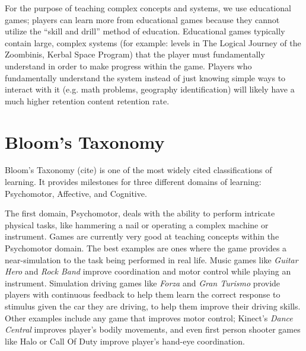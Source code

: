 \documentclass[12pt]{report}
\begin{document}
		For the purpose of teaching complex concepts and systems, we use educational games; players can learn more from educational games because they cannot utilize the ``skill and drill'' method of education. Educational games typically contain large, complex systems (for example: levels in The Logical Journey of the Zoombinis, Kerbal Space Program) that the player must fundamentally understand in order to make progress within the game. Players who fundamentally understand the system instead of just knowing simple ways to interact with it (e.g. math problems, geography identification) will likely have a much higher retention content retention rate.


	\section{Bloom's Taxonomy}

		Bloom's Taxonomy (cite) is one of the most widely cited classifications of learning. It provides milestones for three different domains of learning: Psychomotor, Affective, and Cognitive.

		The first domain, Psychomotor, deals with the ability to perform intricate physical tasks, like hammering a nail or operating a complex machine or instrument. Games are currently very good at teaching concepts within the Psychomotor domain. The best examples are ones where the game provides a near-simulation to the task being performed in real life. Music games like \textit {Guitar Hero} and \textit{Rock Band} improve coordination and motor control while playing an instrument. Simulation driving games like \textit{Forza} and \textit{Gran Turismo} provide players with continuous feedback to help them learn the correct response to stimulus given the car they are driving, to help them improve their driving skills. Other examples include any game that improves motor control; Kinect's \textit{Dance Central} improves player's bodily movements, and even first person shooter games like Halo or Call Of Duty improve player's hand-eye coordination.
\end{document}
